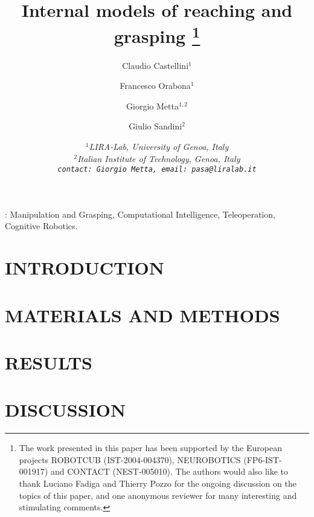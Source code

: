\documentclass[a4paper]{article}
\title{Internal models of reaching and grasping
\footnote{The work presented in this paper has been supported by the
European projects ROBOTCUB (IST-2004-004370), NEUROBOTICS
(FP6-IST-001917) and CONTACT (NEST-005010). The authors would also
like to thank Luciano Fadiga and Thierry Pozzo for the ongoing
discussion on the topics of this paper, and one anonymous reviewer for
many interesting and stimulating comments.}
}
\author{Claudio Castellini$^1$ \and Francesco Orabona$^1$ \and Giorgio
Metta$^{1,2}$ \and Giulio Sandini$^2$}
\date{\small \it{
$^1$LIRA-Lab, University of Genoa, Italy\\
$^2$Italian Institute of Technology, Genoa, Italy\\
{\tt contact: Giorgio Metta, email: pasa@liralab.it}
}}
\begin{document}
\maketitle

\begin{abstract}

\end{abstract}

\vspace{1cm}
:
Manipulation and Grasping,
Computational Intelligence,
Teleoperation,
Cognitive Robotics.

\section{INTRODUCTION}
\label{sec:introduction}


\section{MATERIALS AND METHODS}
\label{sec:exp_desc}


\section{RESULTS}
\label{sec:exp_res}


\section{DISCUSSION}
\label{sec:Conclusions}


{\small


}
\end{document}
